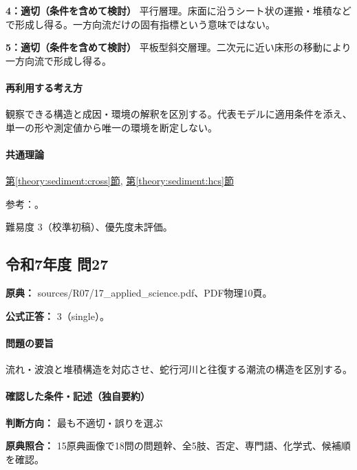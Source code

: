 \noindent\textbf{4：適切（条件を含めて検討）} 平行層理。床面に沿うシート状の運搬・堆積などで形成し得る。一方向流だけの固有指標という意味ではない。\par

\noindent\textbf{5：適切（条件を含めて検討）} 平板型斜交層理。二次元に近い床形の移動により一方向流で形成し得る。\par

\paragraph{再利用する考え方} 観察できる構造と成因・環境の解釈を区別する。代表モデルに適用条件を添え、単一の形や測定値から唯一の環境を断定しない。

\paragraph{共通理論} \hyperref[theory:sediment:cross]{第\ref*{theory:sediment:cross}節}, \hyperref[theory:sediment:hcs]{第\ref*{theory:sediment:hcs}節}

\par 参考：\cite{sed_mit_cross,sed_houston_structures}。

\par 難易度 3（校準初稿）、優先度未評価。

\subsection{令和7年度 問27}
\label{q:r07-reg-applied-27}

\noindent\textbf{原典：} sources/R07/17\_applied\_science.pdf、PDF物理10頁。

\textbf{公式正答：} 3（single）。

\paragraph{問題の要旨} 流れ・波浪と堆積構造を対応させ、蛇行河川と往復する潮流の構造を区別する。

\paragraph{確認した条件・記述（独自要約）}\mbox{}\par

\noindent\textbf{判断方向：} 最も不適切・誤りを選ぶ\par

\noindent\textbf{原典照合：} 15原典画像で18問の問題幹、全5肢、否定、専門語、化学式、候補順を確認。\par

